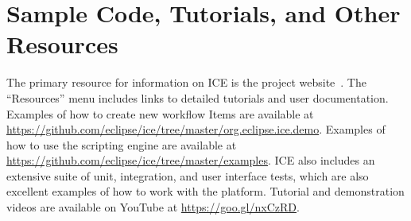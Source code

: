 \section{Sample Code, Tutorials, and Other
Resources}\label{sample-code-tutorials-and-other-resources}

The primary resource for information on ICE is the project 
website~\cite{billings_eclipse_2016}. The ``Resources'' menu includes links to
detailed tutorials and user documentation. Examples of how to create
new workflow Items are available at
\url{https://github.com/eclipse/ice/tree/master/org.eclipse.ice.demo}.
Examples of how to use the scripting engine are available at
\url{https://github.com/eclipse/ice/tree/master/examples}. ICE also includes an
extensive suite of unit, integration, and user interface tests, which are
also excellent examples of how to work with the platform. Tutorial and
demonstration videos are available on YouTube at \url{https://goo.gl/nxCzRD}.